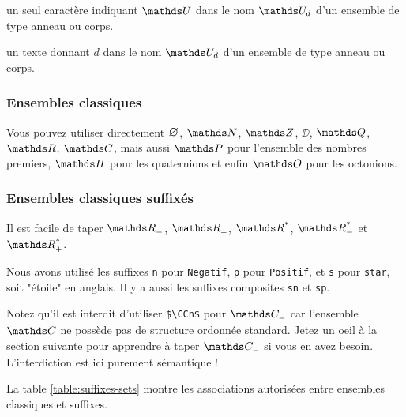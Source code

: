 \documentclass[12pt,a4paper]{article}
\begin{document}
\bigskip



 un seul caractère \ascii{} indiquant $\algeset{U}$ dans le nom $\algeset*{U}{d}$ d'un ensemble de type anneau ou corps.

 un texte donnant $d$ dans le nom $\algeset*{U}{d}$ d'un ensemble de type anneau ou corps.



        \subsubsection{Ensembles classiques}

\begin{tcblisting}{}
Vous pouvez utiliser directement $\nullset$, $\NN$, $\ZZ$, $\DD$, $\QQ$, $\RR$, $\CC$,
mais aussi $\PP$ pour l'ensemble des nombres premiers, $\HH$ pour les quaternions et
enfin $\OO$ pour les octonions.
\end{tcblisting}



        \subsubsection{Ensembles classiques suffixés}

\begin{tcblisting}{}
Il est facile de taper $\RRn$, $\RRp$, $\RRs$, $\RRsn$ et $\RRsp$.
\end{tcblisting}


Nous avons utilisé les suffixes \verb+n+ pour \verb+Negatif+, \verb+p+ pour \verb+Positif+, et \verb+s+ pour \verb+star+, soit "étoile" en anglais. Il y a aussi les suffixes composites \verb+sn+ et \verb+sp+.

\medskip

Notez qu'il est interdit d'utiliser \verb+$\CCn$+ pour $\specialset{\CC}{n}$ car l'ensemble $\CC$ ne possède pas de structure ordonnée standard. Jetez un oeil à la section suivante pour apprendre à taper $\specialset{\CC}{n}$ si vous en avez besoin. L'interdiction est ici purement sémantique !

\medskip

\begin{remark}
	La table \ref{table:suffixes-sets}  montre les associations autorisées entre ensembles classiques et suffixes.
\end{remark}

\end{document}
